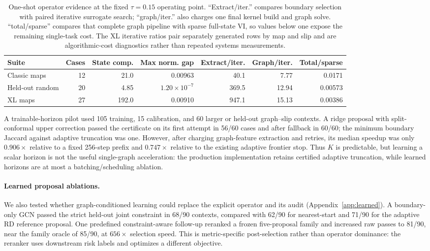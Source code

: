 \documentclass[10pt]{article}
\begin{document}
\begin{table}[H]
\centering
\caption{One-shot operator evidence at the fixed $\tau=0.15$ operating point.
``Extract/iter.'' compares boundary selection with paired iterative surrogate
search; ``graph/iter.'' also charges one final kernel build and graph solve.
``total/sparse'' compares that complete graph pipeline with sparse full-state
VI, so values below one expose the remaining single-task cost. The XL iterative
ratios pair separately generated rows by map and slip and are algorithmic-cost
diagnostics rather than repeated systems measurements.}
\label{tab:one-shot}
\footnotesize
\begin{tabular}{lrrrrrr}
\toprule
Suite & Cases & State comp. & Max norm. gap & Extract/iter. & Graph/iter. & Total/sparse\\
\midrule
Classic maps & 12 & 21.0 & 0.00963 & 40.1 & 7.77 & 0.0171\\
Held-out random & 20 & 4.85 & $1.20\!\times\!10^{-7}$ & 369.5 & 12.94 & 0.00573\\
XL maps & 27 & 192.0 & 0.00910 & 947.1 & 15.13 & 0.00386\\
\bottomrule
\end{tabular}
\end{table}

A trainable-horizon pilot used 105 training, 15 calibration, and 60 larger or
held-out graph--slip contexts. A ridge proposal with split-conformal upper
correction passed the certificate on its first attempt in 56/60 cases and after
fallback in 60/60; the minimum boundary Jaccard against adaptive truncation was
one. However, after charging graph-feature extraction and retries, its median
speedup was only $0.906\times$ relative to a fixed 256-step prefix and
$0.747\times$ relative to the existing adaptive frontier stop. Thus $K$ is
predictable, but learning a scalar horizon is not the useful single-graph
acceleration: the production implementation retains certified adaptive
truncation, while learned horizons are at most a batching/scheduling ablation.

\paragraph{Learned proposal ablations.}
We also tested whether graph-conditioned learning could replace the explicit
operator and its audit (Appendix~\ref{app:learned}). A boundary-only GCN passed
the strict held-out joint constraint in 68/90 contexts, compared with 62/90 for
nearest-start and 71/90 for the adaptive RD reference proposal. One predefined
constraint-aware follow-up reranked a frozen five-proposal family and increased
raw passes to 81/90, near the family oracle of 85/90, at $656\times$ selection
speed. This is metric-specific post-selection rather than operator dominance:
the reranker uses downstream risk labels and optimizes a different objective.
\end{document}
